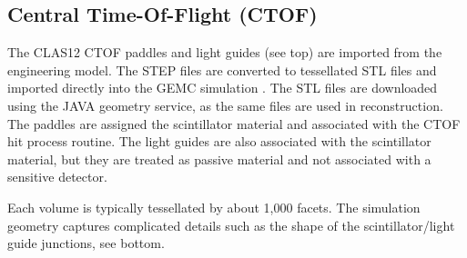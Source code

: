 \subsection{Central Time-Of-Flight (CTOF)} \label{sec:ctof}

The CLAS12 CTOF paddles and light guides (see  top) are imported from the engineering model.
The STEP files are converted to tessellated STL files and imported directly into the GEMC simulation \cite{gemcCad}.
The STL files are downloaded using the JAVA geometry service, as the same files are used in reconstruction.
The paddles are assigned the scintillator material and associated with the CTOF hit process routine.
The light guides are also associated with the scintillator material, but they are treated as passive material and not
associated with a sensitive detector.

Each volume is typically tessellated by about 1,000 facets. The simulation geometry captures complicated details
such as the shape of the scintillator/light guide junctions, see  bottom.

